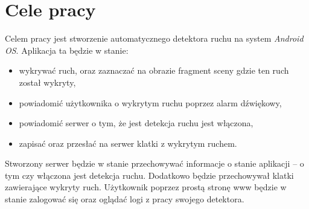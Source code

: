\section{Cele pracy}
\label{sec:cele pracy}

Celem pracy jest stworzenie automatycznego detektora ruchu na system {\it Android OS}. Aplikacja ta będzie w stanie:
\begin{itemize}
	\item wykrywać ruch, oraz zaznaczać na obrazie fragment sceny gdzie ten ruch został wykryty,
	\item powiadomić użytkownika o wykrytym ruchu poprzez alarm dźwiękowy,
	\item powiadomić serwer o tym, że jest detekcja ruchu jest włączona,
	\item zapisać oraz przesłać na serwer klatki z wykrytym ruchem.
\end{itemize}

Stworzony serwer będzie w stanie przechowywać informacje o stanie aplikacji -- o tym czy włączona jest detekcja ruchu. Dodatkowo będzie przechowywał klatki zawierające wykryty ruch. Użytkownik poprzez prostą stronę www będzie w stanie zalogować się oraz oglądać logi z pracy swojego detektora.